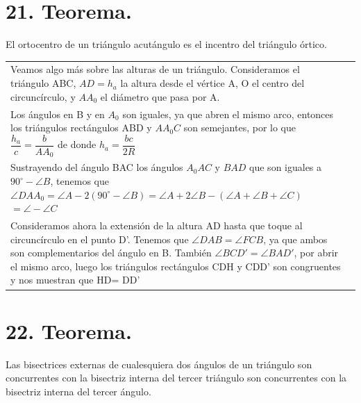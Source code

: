\documentclass[12pt,a4paper, oneside]{book}
\begin{document}
\section{21. Teorema.}
El ortocentro de un triángulo acutángulo es el incentro del triángulo órtico.
\\
\begin{tabular}{p{15.9 cm} p{1cm}}
Veamos algo más sobre las alturas de un triángulo. Consideramos el triángulo ABC, $AD=h_a$ la altura desde el vértice A, O el centro del circuncírculo, y $AA_0$ el diámetro que pasa por A.
\\Los ángulos en B y en $A_0$ son iguales, ya que abren el mismo arco, entonces los triángulos rectángulos ABD y $AA_0C$ son semejantes, por lo que $\dfrac{h_a}{c}=\dfrac{b}{AA_0}$ de donde $h_a=\dfrac{bc}{2R}$
\\Sustrayendo del ángulo BAC los ángulos $A_0AC$ y $BAD$ que son iguales a $90^\circ - \angle B$, tenemos que
$\angle DAA_0 = \angle A -2(90^\circ - \angle B)=\angle A + 2\angle B- (\angle A+ \angle B + \angle C)$
$=\angle - \angle C$
\\Consideramos ahora la extensión de la altura AD hasta que toque al circuncírculo en el punto D'. Tenemos que $\angle DAB = \angle FCB$, ya que ambos son complementarios  del ángulo en B. También $\angle BCD' = \angle BAD'$, por abrir  el mismo arco, luego los triángulos rectángulos CDH y CDD' son congruentes y nos muestran que HD= DD'
\end{tabular}
\section{22. Teorema.}
Las bisectrices externas de cualesquiera dos ángulos de un triángulo son concurrentes con la bisectriz interna del tercer triángulo son concurrentes con la bisectriz interna del tercer ángulo.
\end{document}
